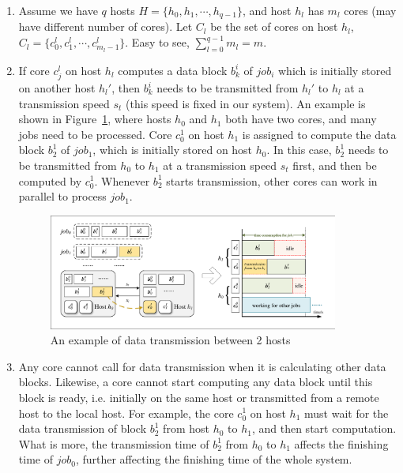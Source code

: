 \documentclass{llncs}
\begin{document}
\begin{enumerate}

  \item Assume we have $q$ hosts $H=\{h_0, h_1, \cdots, h_{q-1}\}$, and host $h_l$ has $m_l$ cores (may have different number of cores). Let $C_l$ be the set of cores on host $h_l$, $C_l = \{c^l_0, c^l_1, \cdots, c^l_{m_l-1}\}$. Easy to see, $\sum_{l=0}^{q-1} m_l = m$.

  \vspace{2mm}

  \item If core $c^l_j$ on host $h_l$ computes a data block $b^i_{k}$ of $job_i$ which is initially stored on another host $h_l'$, then $b^i_{k}$ needs to be transmitted from $h_l'$ to $h_l$ at a transmission speed $s_t$ (this speed is fixed in our system). An example is shown in Figure~\ref{Fig-Transmission}, where hosts $h_0$ and $h_1$ both have two cores, and many jobs need to be processed. Core $c^1_0$ on host $h_1$ is assigned to compute the data block $b^1_2$ of $job_1$, which is initially stored on host $h_0$. In this case, $b^1_2$ needs to be transmitted from $h_0$ to $h_1$ at a transmission speed $s_t$ first, and then be computed by $c^1_0$. Whenever $b^1_2$ starts transmission, other cores can work in parallel to process $job_1$.

  \begin{figure}[H]
  \begin{center}
  \includegraphics[width=0.9\textwidth]{Fig-Transmission.pdf}
  \caption{An example of data transmission between 2 hosts}
  \label{Fig-Transmission}
  \end{center}
  \end{figure}

  \item Any core cannot call for data transmission when it is calculating other data blocks. Likewise, a core cannot start computing any data block until this block is ready, i.e. initially on the same host or transmitted from a remote host to the local host. For example, the core $c^1_0$ on host $h_1$ must wait for the data transmission of block $b^1_2$ from host $h_0$ to $h_1$, and then start computation. What is more, the transmission time of $b^1_2$ from $h_0$ to $h_1$ affects the finishing time of $job_0$, further affecting the finishing time of the whole system.


\end{enumerate}
\end{document}

